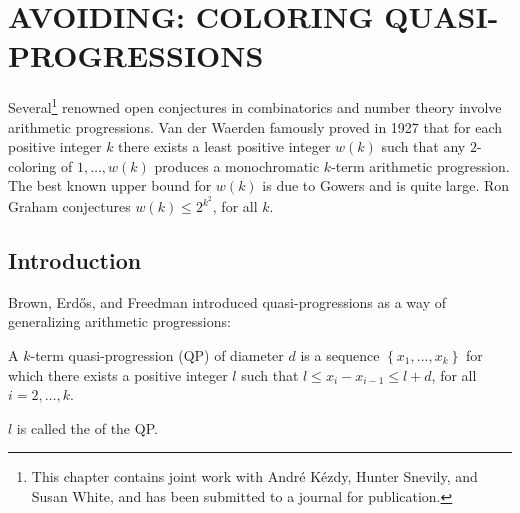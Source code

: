 \chapter{AVOIDING: COLORING QUASI-PROGRESSIONS}

Several\footnote{This chapter contains joint work with Andr\'e K\'ezdy, Hunter Snevily, and Susan White, and has been submitted to a journal for publication.} renowned open conjectures in combinatorics and number theory involve arithmetic progressions. Van der Waerden famously proved in 1927 that for each positive integer $k$ there exists a least positive integer $w(k)$ such that any $2$-coloring of $1,\ldots,w(k)$ produces a monochromatic $k$-term arithmetic progression. The best known upper bound for $w(k)$ is due to Gowers and is quite large. Ron Graham \cite{G} conjectures $w(k) \leq 2^{k^2}$, for all $k$. 

\section{Introduction}
Brown, Erd\H{o}s, and Freedman \cite{B} introduced quasi-progressions as a way of generalizing arithmetic progressions: 
\begin{definition}A $k$-term quasi-progression (QP) of diameter $d$ is a sequence $\left\{x_1, \ldots, x_k\right\}$ for which there exists a positive integer $l$ such that $l \leq x_{i} - x_{i-1} \leq l+d$, for all $i=2,\ldots,k$.

$l$ is called the  of the QP.
\end{definition}

